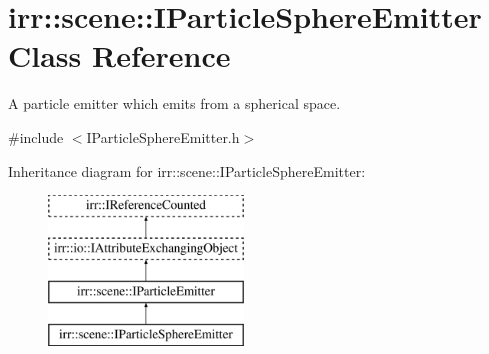 \hypertarget{classirr_1_1scene_1_1IParticleSphereEmitter}{}\section{irr\+:\+:scene\+:\+:I\+Particle\+Sphere\+Emitter Class Reference}
\label{classirr_1_1scene_1_1IParticleSphereEmitter}


A particle emitter which emits from a spherical space.  




{\ttfamily \#include $<$I\+Particle\+Sphere\+Emitter.\+h$>$}

Inheritance diagram for irr\+:\+:scene\+:\+:I\+Particle\+Sphere\+Emitter\+:\begin{figure}[H]
\begin{center}
\leavevmode
\includegraphics[height=4.000000cm]{classirr_1_1scene_1_1IParticleSphereEmitter}
\end{center}
\end{figure}
